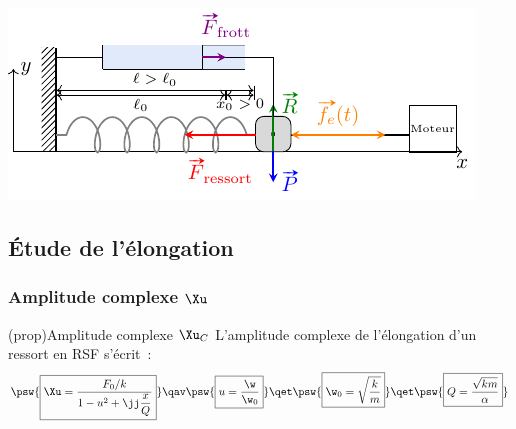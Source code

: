 \documentclass[../../main/main.tex]{subfiles}
\begin{document}
\begin{tcb*}
\begin{isd}[righthand ratio=.45]
\begin{center}
{			}{
				\includegraphics[width=\linewidth]{ressort-horiz}
			}
			\vspace{-15pt}
		\end{center}
	\end{isd}
\end{tcb*}

\subsection{Étude de l'élongation}
\subsubsection{Amplitude complexe $\Xu$}

\begin{tcb}(prop){Amplitude complexe $\Xu_C$}
	L'amplitude complexe de l'élongation d'un ressort en RSF s'écrit~:
	\[
		\psw{%
			\boxed{
				\Xu =
				\frac{F_0/k}{1 - u ^2 + \jj\dfrac{x}{Q}}
			}
		}%
		\qav
		\psw{\boxed{u = \frac{\w}{\w_0}}}
		\qet
		\psw{\boxed{\w_0 = \sqrt{\frac{k}{m}}}}
		\qet
		\psw{\boxed{Q = \frac{\sqrt{km}}{\alpha}}}
	\]
\end{tcb}
\end{document}
